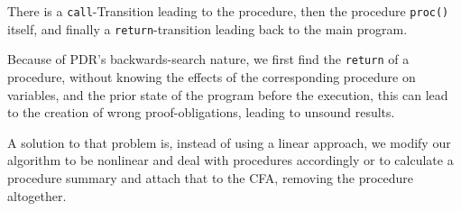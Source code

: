 \documentclass[11pt, a4paper, BCOR=10mm, ngerman]{scrbook}
\begin{document}
There is a \texttt{call}-Transition leading to the procedure, then the procedure \texttt{proc()} itself, and finally a \texttt{return}-transition leading back to the main program. \par
Because of PDR's backwards-search nature, we first find the \texttt{return} of a procedure, without knowing the effects of the corresponding procedure on variables, and the prior state of the program before the execution, this can lead to the creation of wrong proof-obligations, leading to unsound results. \par

A solution to that problem is, instead of using a linear approach, we modify our algorithm to be nonlinear and deal with procedures accordingly \cite{DBLP:conf/sat/HoderB12} or to calculate a procedure summary and attach that to the CFA, removing the procedure altogether.
%

%
%
\end{document}
